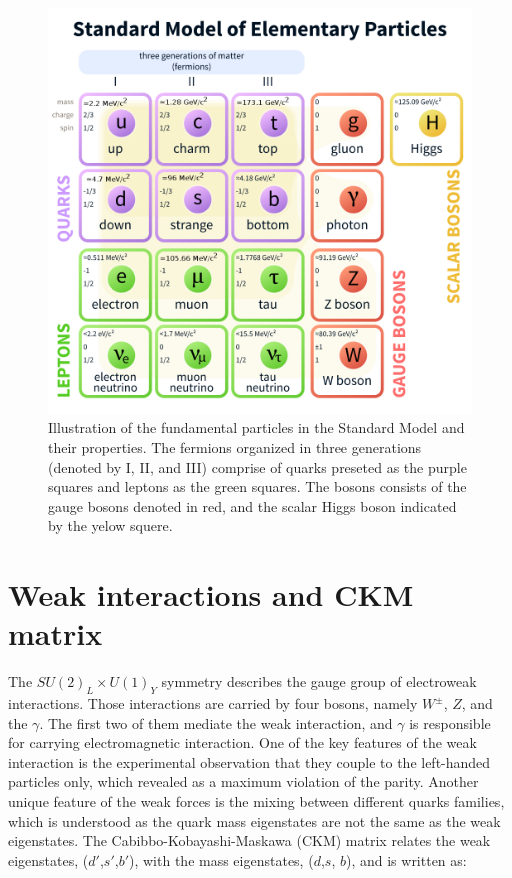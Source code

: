 \begin{figure}
\centering
\includegraphics[scale=0.5]{figures/SM.png}
\caption{Illustration of the fundamental particles in the Standard Model and their properties. The fermions organized in three generations (denoted by I, II, and III) comprise of quarks preseted as the purple squares and leptons as the green squares. The bosons consists of the gauge bosons denoted in red, and  the scalar Higgs boson indicated by the yelow squere. 
\label{fig:SM}}
\end{figure}

\section{Weak interactions and CKM matrix}

The $ SU(2)_L \times U(1)_Y$ symmetry describes the gauge group of electroweak interactions. Those interactions are carried by four bosons, namely $W^{\pm}$, $Z$, and the $\gamma$.  The first two of them mediate the weak interaction, and $\gamma$ is responsible for carrying electromagnetic interaction. One of the key features of the weak interaction is the experimental observation that they couple to the left-handed particles only, which revealed as a maximum violation of the parity. Another unique feature of the weak forces is the mixing between different quarks families, which is understood as the quark mass eigenstates are not the same as the weak eigenstates. The Cabibbo-Kobayashi-Maskawa (CKM) matrix relates the weak eigenstates,  ($d\prime$,$s\prime$,$b\prime$), with the mass eigenstates, ($d$,$s$, $b$), and is written as:

